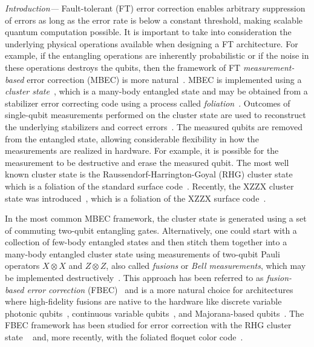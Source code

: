 \documentclass[reprint,
groupedaddress,
 prl,amsmath,amssymb,
 aps]{revtex4-2}
\theoremstyle{definition}
\begin{document}
\begin{bibunit}

{\it Introduction---} Fault-tolerant (FT) error correction enables arbitrary suppression of errors as long as the error rate is below a constant threshold, making scalable quantum computation possible. It is important to take into consideration the underlying physical operations available when designing a FT architecture. For example, if the entangling operations are inherently probabilistic or if the noise in these operations destroys the qubits, then the framework of FT {\it measurement-based} error correction (MBEC) is more natural~\cite{menicucci2006universal,bourassa2021blueprint,bartolucci2021fusion}. MBEC is implemented using a {\it cluster state}~\cite{briegel2001persistent,raussendorf2001one,raussendorf2002one,raussendorf2003measurement,briegel2009measurement}, which is a many-body entangled state and may be obtained from a stabilizer error correcting code using a process called {\it foliation}~\cite{raussendorf2006fault,raussendorf2007fault, bolt2016foliated,brown2020universal}. Outcomes of {single-qubit} measurements performed on the cluster state are used to reconstruct the underlying stabilizers and correct errors~\cite{raussendorf2006fault,raussendorf2007topological}. { {The measured qubits are removed from the entangled state, allowing considerable flexibility in how the measurements are realized in hardware. For example, it is possible for the measurement to be destructive and erase the measured qubit.}} The most well known cluster state is the Raussendorf-Harrington-Goyal (RHG) cluster state~\cite{raussendorf2005long,raussendorf2006fault,raussendorf2007topological} which is a foliation of the standard surface code~\cite{kitaev1997quantum}. Recently, the XZZX cluster state was introduced~\cite{claes2022tailored}, which is a foliation of the XZZX surface code~\cite{wen2003quantum,ataides2021xzzx}.


In the most common MBEC framework, the cluster state is generated using a set of commuting two-qubit entangling gates. Alternatively, one could start with a collection of few-body entangled states and then stitch them together into a many-body entangled cluster state using measurements of two-qubit Pauli operators $X\otimes X$ and $Z\otimes Z$, also called {\it fusions} or {\it Bell measurements}, { {which may be implemented destructively~\cite{browne2005resource}.}} This approach has been referred to as {\it fusion-based error correction} (FBEC)~\cite{bartolucci2021fusion} and is a more natural choice for architectures where 
 {{high-fidelity fusions are native to the hardware}} like discrete variable photonic qubits~\cite{browne2005resource}, {{continuous variable qubits~\cite{fukui2018high,fukui2019high}}}, and Majorana-based qubits~\cite{chao2020optimization}. {{The FBEC framework has been studied for error correction with the RHG cluster state ~\cite{bartolucci2021fusion} and, more recently, with the foliated floquet color code~\cite{paesani2022high}. }}



\end{bibunit}
\end{document}
